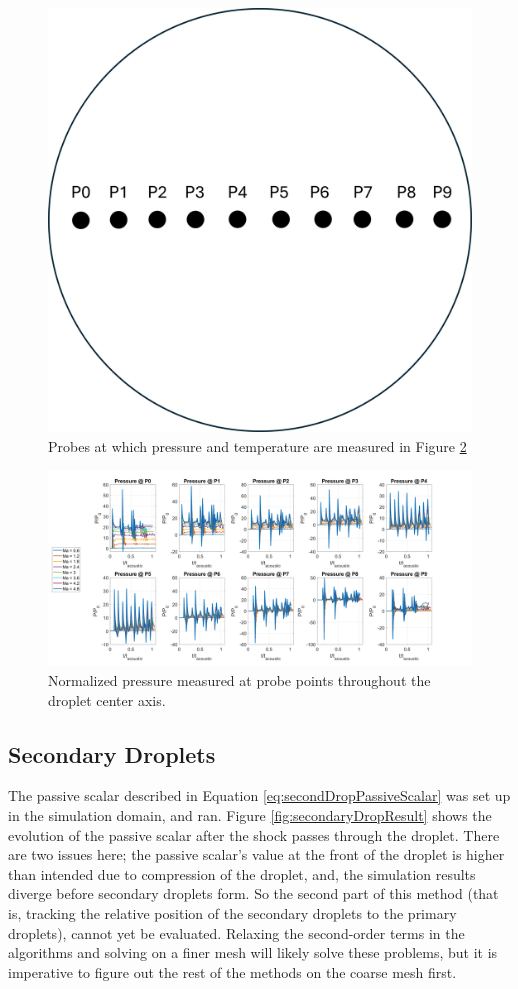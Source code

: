 \documentclass{UCF_ETD}
\begin{document}
\begin{figure}
    \centering
    \includegraphics[width=0.5\linewidth]{Figures/probes_points.png}
    \caption{Probes at which pressure and temperature are measured in Figure \ref{fig:pressure_mach_sweep}}
    \label{fig:point_probes}
\end{figure}

\begin{landscape}
    \begin{figure}
        \centering
        \includegraphics[width=\textwidth,height=\textheight,keepaspectratio]{Figures/pressures_Mach_sweep.png}
        \caption{Normalized pressure measured at probe points throughout the droplet center axis.}
        \label{fig:pressure_mach_sweep}
    \end{figure}
\end{landscape}

\subsection{Secondary Droplets}
\label{subsec:secondaryDropResults}
The passive scalar described in Equation \ref{eq:secondDropPassiveScalar} was set up in the simulation domain, and ran. Figure \ref{fig:secondaryDropResult} shows the evolution of the passive scalar after the shock passes through the droplet. There are two issues here; the passive scalar's value at the front of the droplet is higher than intended due to compression of the droplet, and, the simulation results diverge before secondary droplets form. So the second part of this method (that is, tracking the relative position of the secondary droplets to the primary droplets), cannot yet be evaluated. Relaxing the second-order terms in the algorithms and solving on a finer mesh will likely solve these problems, but it is imperative to figure out the rest of the methods on the coarse mesh first. 
\end{document}
